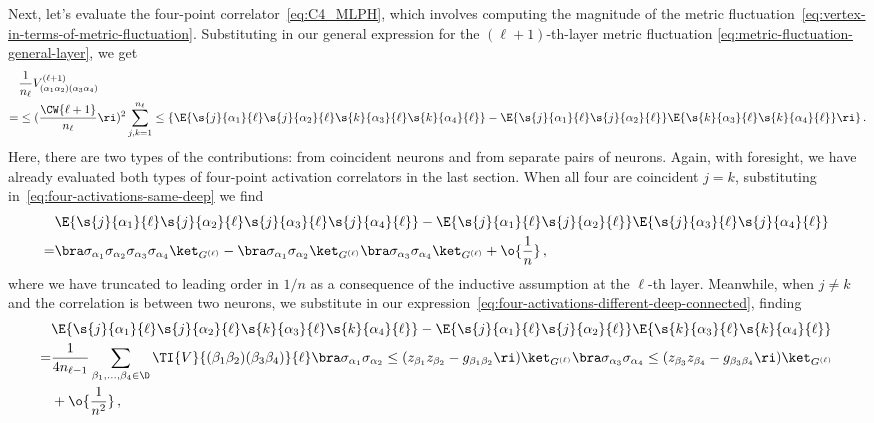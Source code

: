 Next, let's evaluate the four-point correlator~\eqref{eq:C4_MLPH},
which involves computing the magnitude of the metric fluctuation~\eqref{eq:vertex-in-terms-of-metric-fluctuation}. Substituting in our general expression for the $(\ell+1)$-th-layer metric fluctuation \eqref{eq:metric-fluctuation-general-layer}, we get
\begin{align}\label{eq:midpoint-vertex-recursion}
&\frac{1}{n_{\ell}}V^{(\ell+1)}_{(\alpha_1\alpha_2)(\alpha_3\alpha_4)}\, \\
=&\le(\frac{\CW{\ell+1}}{n_{\ell}}\ri)^2  \sum_{j,k=1}^{n_{\ell}}  \le\{ \E{ \s{j}{\alpha_1}{\ell}\s{j}{\alpha_2}{\ell}\s{k}{\alpha_3}{\ell}\s{k}{\alpha_4}{\ell} }  -\E{\s{j}{\alpha_1}{\ell}\s{j}{\alpha_2}{\ell}}\E{\s{k}{\alpha_3}{\ell}\s{k}{\alpha_4}{\ell}} \ri\} \, .\nonumber%
\end{align}
Here, there are two types of the contributions: from coincident neurons and from separate pairs of neurons. Again, with foresight, we have already evaluated both types of four-point activation correlators in the last section. When all four are coincident $j=k$, substituting in~\eqref{eq:four-activations-same-deep} we find
\begin{align}\label{eq:activation-four-point-same-neurons}
 &\E{ \s{j}{\alpha_1}{\ell}\s{j}{\alpha_2}{\ell}\s{j}{\alpha_3}{\ell}\s{j}{\alpha_4}{\ell} }  -\E{\s{j}{\alpha_1}{\ell}\s{j}{\alpha_2}{\ell}}\E{\s{j}{\alpha_3}{\ell}\s{j}{\alpha_4}{\ell}} \, \\
 =&\bra\sigma_{\alpha_1} \sigma_{\alpha_2} \sigma_{\alpha_3} \sigma_{\alpha_4}\ket_{G^{(\ell)}}  - \bra \sigma_{\alpha_1} \sigma_{\alpha_2}\ket_{G^{(\ell)}} \bra \sigma_{\alpha_3} \sigma_{\alpha_4}\ket_{G^{(\ell)}} +\o{\frac{1}{n}}\, , \nonumber
\end{align}
where we have truncated to leading order in $1/n$ as a consequence of the inductive assumption at the $\ell$-th layer. Meanwhile, when $j \neq k$ and the correlation is between two neurons, we substitute in our expression~\eqref{eq:four-activations-different-deep-connected}, finding
\begin{align}\label{eq:activation-four-point-different-neurons}
&\E{ \s{j}{\alpha_1}{\ell}\s{j}{\alpha_2}{\ell}\s{k}{\alpha_3}{\ell}\s{k}{\alpha_4}{\ell} }  -\E{\s{j}{\alpha_1}{\ell}\s{j}{\alpha_2}{\ell}}\E{\s{k}{\alpha_3}{\ell}\s{k}{\alpha_4}{\ell}}\, \\
=&\frac{1}{4n_{\ell-1}}\sum_{\beta_1,\ldots,\beta_4\in\D}\TI{V}{(\beta_1\beta_2)(\beta_3\beta_4)}{\ell}\bra \sigma_{\alpha_1}\sigma_{\alpha_2} \le(z_{\beta_1} z_{\beta_2}-g_{\beta_1\beta_2}\ri)\ket_{G^{(\ell)}}\bra \sigma_{\alpha_3}\sigma_{\alpha_4} \le(z_{\beta_3} z_{\beta_4}-g_{\beta_3\beta_4}\ri)\ket_{G^{(\ell)}}\, \nonumber\\
&+\o{\frac{1}{n^2}} \, ,\nonumber
\end{align}
